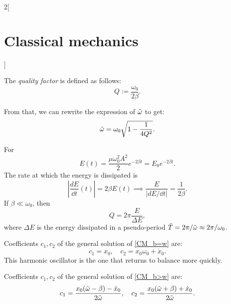 \documentclass[../../../main.tex]{subfiles}
\begin{document}
\begin{multicols}{2}[\section{Classical mechanics}]
\begin{prop}
    \end{prop}
    \begin{definition}
        The \textit{quality factor} is defined as follows: $$Q:=\frac{\omega_0}{2\beta}.$$
    \end{definition}
    \noindent From that, we can rewrite the expression of $\Tilde{\omega}$ to get: $$\Tilde{\omega}=\omega_0\sqrt{1-\frac{1}{4Q^2}}.$$
    \begin{prop}
        For
        $$E(t)=\frac{\mu\omega_0^2A^2}{2}e^{-2\beta t}=E_0e^{-2\beta t}.$$ The rate at which the energy is dissipated is $$\left|\frac{dE}{\dd t}(t)\right|=2\beta E(t)\implies\frac{E}{\left|dE/\dd t\right|}=\frac{1}{2\beta}.$$
        If $\beta\ll\omega_0$, then $$Q=2\pi\frac{E}{\Delta E},$$ where $\Delta E$ is the energy dissipated in a pseudo-period $\Tilde{T}=2\pi/\Tilde{\omega}\approx2\pi/\omega_0$.
    \end{prop}
    \begin{prop}[Critically damped harmonic oscillator: $\beta=\omega_0$]
        Coefficients $c_1,c_2$ of the general solution of \cref{CM_b=w} are: $$c_1=x_0,\quad c_2=x_0\omega_0+\dot{x}_0.$$ This harmonic oscillator is the one that returns to balance more quickly.
    \end{prop}
    \begin{prop}
        Coefficients $c_1,c_2$ of the general solution of \cref{CM_b>w} are: $$c_1=\frac{x_0(\Tilde{\omega}-\beta)-\dot{x}_0}{2\Tilde{\omega}},\quad c_2=\frac{x_0(\Tilde{\omega}+\beta)+\dot{x}_0}{2\Tilde{\omega}}.$$
    \end{prop}

\end{multicols}
\end{document}

